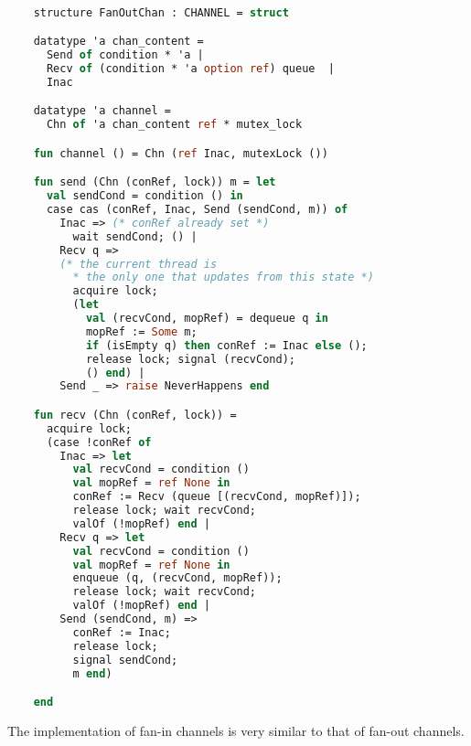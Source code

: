\documentclass{article}
\begin{document}
  \begin{lstlisting}[language=ML, escapechar=\%]

    structure FanOutChan : CHANNEL = struct

    datatype 'a chan_content =
      Send of condition * 'a |
      Recv of (condition * 'a option ref) queue  |
      Inac

    datatype 'a channel =
      Chn of 'a chan_content ref * mutex_lock

    fun channel () = Chn (ref Inac, mutexLock ())

    fun send (Chn (conRef, lock)) m = let
      val sendCond = condition () in
      case cas (conRef, Inac, Send (sendCond, m)) of
        Inac => (* conRef already set *)
          wait sendCond; () |
        Recv q => 
        (* the current thread is
          * the only one that updates from this state *)
          acquire lock;
          (let
            val (recvCond, mopRef) = dequeue q in
            mopRef := Some m; 
            if (isEmpty q) then conRef := Inac else (); 
            release lock; signal (recvCond);
            () end) |
        Send _ => raise NeverHappens end

    fun recv (Chn (conRef, lock)) =
      acquire lock;
      (case !conRef of
        Inac => let
          val recvCond = condition ()
          val mopRef = ref None in
          conRef := Recv (queue [(recvCond, mopRef)]);
          release lock; wait recvCond;
          valOf (!mopRef) end |
        Recv q => let
          val recvCond = condition () 
          val mopRef = ref None in
          enqueue (q, (recvCond, mopRef));
          release lock; wait recvCond;
          valOf (!mopRef) end |
        Send (sendCond, m) =>
          conRef := Inac;
          release lock;
          signal sendCond;
          m end) 

    end 
  \end{lstlisting}

The implementation of fan-in channels is very similar to that of fan-out channels.
\end{document}
